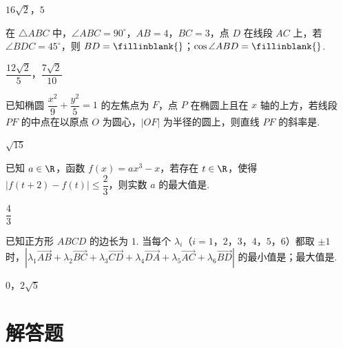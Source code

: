 \begin{answer}
\(16\sqrt{2}\)，\(5\)
\end{answer}

\begin{problem}
在 \(\triangle ABC\) 中，\(\angle ABC=90^\circ\)，\(AB=4\)，\(BC=3\)，点 \(D\) 在线段 \(AC\) 上，若 \(\angle BDC=45^\circ\)，则 \(BD=\fillinblank{}\)；\(\cos\angle ABD=\fillinblank{}\).
\end{problem}

\begin{answer}
\(\dfrac{12\sqrt{2}}{5}\)，\(\dfrac{7\sqrt{2}}{10}\)
\end{answer}

\begin{problem}
已知椭圆 \(\dfrac{x^2}{9}+\dfrac{y^2}{5}=1\) 的左焦点为 \(F\)，点 \(P\) 在椭圆上且在 \(x\) 轴的上方，若线段 \(PF\) 的中点在以原点 \(O\) 为圆心，\(|OF|\) 为半径的圆上，则直线 \(PF\) 的斜率是\fillinblank{}.
\end{problem}

\begin{answer}
\(\sqrt{15}\)
\end{answer}

\begin{problem}
已知 \(a\in\R\)，函数 \(f(x)=ax^3-x\)，若存在 \(t\in\R\)，使得 \(\left|f(t+2)-f(t)\right|\le\dfrac23\)，则实数 \(a\) 的最大值是\fillinblank{}.
\end{problem}

\begin{answer}
\(\dfrac{4}{3}\)
\end{answer}

\begin{problem}
已知正方形 \(ABCD\) 的边长为 \(1\). 当每个 \(\lambda_i\)（\(i=1\)，\(2\)，\(3\)，\(4\)，\(5\)，\(6\)）都取 \(\pm1\) 时，\(\left|\lambda_1\overrightarrow{AB}+\allowbreak\lambda_2\overrightarrow{BC}+\allowbreak\lambda_3\overrightarrow{CD}+\allowbreak\lambda_4\overrightarrow{DA}+\allowbreak\lambda_5\overrightarrow{AC}+\allowbreak\lambda_6\overrightarrow{BD}\right|\) 的最小值是\fillinblank{}；最大值是\fillinblank{}.
\end{problem}

\begin{answer}
\(0\)，\(2\sqrt{5}\)
\end{answer}

\section{解答题}

